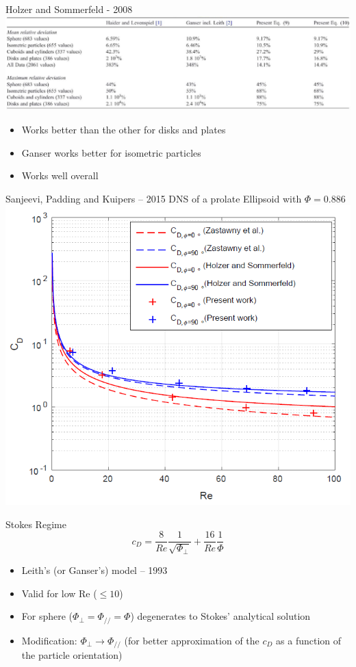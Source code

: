 \documentclass[11pt]{beamer}
\begin{document}
	\begin{frame}{Holzer and Sommerfeld - 2008}
		\includegraphics[width=\linewidth]{ComparisonH&S.png}
		\begin{itemize}
			\item Works better than the other for disks and plates
			\item Ganser works better for isometric particles
			\item Works well overall
		\end{itemize}
	\end{frame}

	\begin{frame}{Sanjeevi, Padding and Kuipers -- 2015}
		DNS of a prolate Ellipsoid with $ \Phi = 0.886 $
		\centering
		\includegraphics[height=.8\textheight]{DNS.png}
	\end{frame}

	\begin{frame}{Stokes Regime}
		\begin{equation*}
			c_D = \frac{8}{Re} \frac{1}{\sqrt{\Phi_{\perp}}} + \frac{16}{Re} \frac{1}{\Phi}
		\end{equation*}
		\vfill
		\begin{itemize}
			\item Leith's (or Ganser's) model -- 1993
			\item Valid for low Re ($\leq 10$)
			\item For sphere ($ \Phi_{\perp} = \Phi_{/\!/} = \Phi $) degenerates to Stokes' analytical solution
			\item Modification: $ \Phi_{\perp} \rightarrow \Phi_{/\!/} $   (for better approximation of the $ c_D $ as a function of the particle orientation)
		\end{itemize}
	\end{frame}
\end{document}
